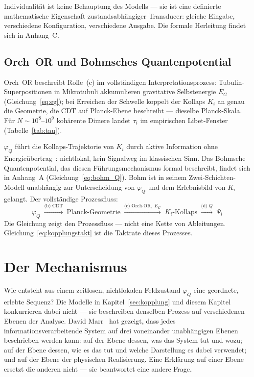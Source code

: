 \documentclass[11pt,a4paper]{article}
\begin{document}
Individualität ist keine Behauptung des Modells — sie ist eine definierte
mathematische Eigenschaft zustandsabhängiger Transducer: gleiche Eingabe,
verschiedene Konfiguration, verschiedene Ausgabe. Die formale Herleitung
findet sich in Anhang~C.

\subsection*{Orch~OR und Bohmsches Quantenpotential}

Orch~OR beschreibt Rolle~(c) im vollständigen Interpretationsprozess:
Tubulin-Superpositionen in Mikrotubuli akkumulieren gravitative Selbstenergie $E_G$
(Gleichung~\eqref{eq:eg}); bei Erreichen der Schwelle koppelt der Kollaps $K_i$
an genau die Geometrie, die CDT auf Planck-Ebene beschreibt — dieselbe Planck-Skala.
Für $N \sim 10^8$–$10^9$ kohärente Dimere landet $\tau_i$ im empirischen
Libet-Fenster (Tabelle~\ref{tab:tau}).

$\varphi_Q$ führt die Kollaps-Trajektorie von $K_i$ durch aktive Information
ohne Energieübertrag~\citep{bohm1980}: nichtlokal, kein Signalweg im klassischen
Sinn. Das Bohmsche Quantenpotential, das diesen Führungsmechanismus formal
beschreibt, findet sich in Anhang~A (Gleichung~\eqref{eq:bohm_Q}). Bohm ist in seinem Zwei-Schichten-Modell unabhängig zur Unterscheidung
von $\varphi_Q$ und dem Erlebnisbild von $K_i$ gelangt.
Der vollständige Prozessfluss:
\begin{equation}
  \varphi_Q \;\xrightarrow{\text{(b) CDT}}\;
  \text{Planck-Geometrie} \;\xrightarrow{\text{(c) Orch-OR},\;E_G}\;
  K_i\text{-Kollaps} \;\xrightarrow{\text{(d)}\;Q}\; \Psi_i
  \label{eq:kopplungskette}
\end{equation}
Die Gleichung zeigt den Prozessfluss — nicht eine Kette von Ableitungen.
Gleichung~\eqref{eq:kopplungstakt} ist die Taktrate dieses Prozesses.

\section{Der Mechanismus}
\label{sec:mechanismus}

Wie entsteht aus einem zeitlosen, nichtlokalen Feldzustand $\varphi_Q$ eine
geordnete, erlebte Sequenz? Die Modelle in Kapitel~\ref{sec:kopplung} und
diesem Kapitel konkurrieren dabei nicht — sie beschreiben denselben Prozess
auf verschiedenen Ebenen der Analyse. David Marr~\citep{marr1982} hat gezeigt,
dass jedes informationsverarbeitende System auf drei voneinander unabhängigen
Ebenen beschrieben werden kann: auf der Ebene dessen, was das System tut und
wozu; auf der Ebene dessen, wie es das tut und welche Darstellung es dabei
verwendet; und auf der Ebene der physischen Realisierung. Eine Erklärung auf
einer Ebene ersetzt die anderen nicht — sie beantwortet eine andere Frage.
\end{document}
